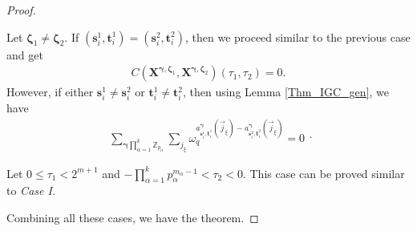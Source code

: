 \documentclass[pdflatex,sn-mathphys-num]{sn-jnl}%
\theoremstyle{thmstyleone}
\begin{document}
\begin{proof}
\begin{mycases}
\begin{mysubcases}
				\item Let $\bm{\zeta}_1 \neq \bm{\zeta}_2$. If $(\mathbf{s}_i^1, \mathbf{t}_i^1)= (\mathbf{s}_i^2, \mathbf{t}_i^2)$, then we  proceed similar to the previous case and get
				\begin{equation}
					\begin{split}
						C\left( \mathbf{X}^{\bm{\gamma},\bm{\zeta}_1}, \mathbf{X}^{\bm{\gamma}, \bm{\zeta}_2} \right) (\tau_1, \tau_2)=0.
					\end{split}
				\end{equation}
				However, if either $\mathbf{s}_i^1 \neq \mathbf{s}_i^2$ or $\mathbf{t}_i^1 \neq \mathbf{t}_i^2$, then using Lemma \ref{Thm_IGC_gen}, we have
				\begin{equation}
					\begin{split}
						\sum_{\bm{\gamma} \prod_{\alpha=1}^{k} \mathbb{Z}_{p_\alpha}}^{ }	\sum_{j_{\xi}}^{} \omega_q^{a_{\mathbf{s}_i^1,\mathbf{t}_i^1}^{\bm{\gamma}} (\vec{j}_{\xi})-a_{\mathbf{s}_i^2,\mathbf{t}_i^2}^{\bm{\gamma}} (\vec{j}_{\xi}) }=0
					\end{split}.
				\end{equation} 
			\end{mysubcases}
			
			\item Let  $0 \leq \tau_1 < 2^{m+1}$ and $ -\prod_{\alpha=1}^{k} p_\alpha^{m_\alpha-1} < \tau_2 < 0$. This case can be proved similar to \textit{Case I}.
		\end{mycases}
		Combining all these cases, we have the theorem.
	\end{proof}
	
\end{document}
